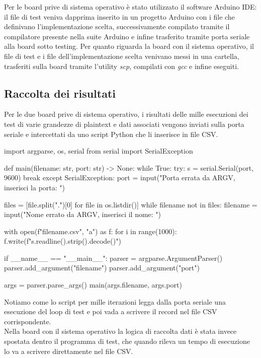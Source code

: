 Per le board prive di sistema operativo è stato utilizzato il software Arduino IDE: il file di test veniva dapprima inserito in un progetto Arduino con i file che definivano l'implementazione scelta, successivamente compilato tramite il compilatore presente nella suite Arduino e infine trasferito tramite porta seriale alla board sotto testing. Per quanto riguarda la board con il sistema operativo, il file di test e i file dell'implementazione scelta venivano messi in una cartella, trasferiti sulla board tramite l'utility \textit{scp}, compilati con \textit{gcc} e infine eseguiti.

\subsection{Raccolta dei risultati}

Per le due board prive di sistema operativo, i risultati delle mille esecuzioni dei test di varie grandezze di plaintext e dati associati vengono inviati sulla porta seriale e intercettati da uno script Python che li inserisce in file CSV.

\begin{python}
import argparse, os, serial
from serial import SerialException


def main(filename: str, port: str) -> None:
  while True:
    try:
      s = serial.Serial(port, 9600)
        break
      except SerialException:
        port = input("Porta errata da ARGV, inserisci la porta: ")

  files = [file.split(".")[0] for file in os.listdir()]
  while filename not in files:
    filename = input("Nome errato da ARGV, inserisci il nome: ")

  with open(f"{filename}.csv", "a") as f:
    for i in range(1000):
      f.write(f"{s.readline().strip().decode()}\n")


if __name__ == "__main__":
  parser = argparse.ArgumentParser()
  parser.add_argument("filename")
  parser.add_argument("port")

  args = parser.parse_args()
  main(args.filename, args.port)
\end{python}

\noindent Notiamo come lo script per mille iterazioni legga dalla porta seriale una esecuzione del loop di test e poi vada a scrivere il record nel file CSV corrispondente. \\

\noindent Nella board con il sistema operativo la logica di raccolta dati è stata invece spostata dentro il programma di test, che quando rileva un tempo di esecuzione lo va a scrivere direttamente nel file CSV.

